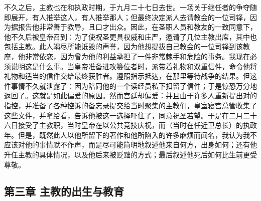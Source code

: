 不久之后，主教也在和执政时期，于九月二十七日去世。一场关于继任者的争夺随即展开，有人推举这人，有人推举那人；但最终决定派人去请教会的一位司铎，因为据报告他非常善于教导，且口才出众。因此，在圣职人员和教友的一致同意下，他不久后被皇帝召到：为了使祝圣更具权威和庄严，邀请了几位主教出席，其中也包括主教。此人竭尽所能诋毁的声誉，因为他想提拔自己教会的一位司铎到该教座，他非常依恋，因为曾为他的利益承担了一件非常棘手和危险的事务。我现在必须说明这是什么事。当皇帝准备进攻篡位者时，派带着礼物和双重信件，命令他将礼物和适当的信件交给最终获胜者。遵照指示抵达，在那里等待战争的结果。但这件事情不久就泄露了：因为陪同他的一个读经员私下扣留了信件；于是惊恐万分地返回了。这就是如此偏爱的原因。然而宫廷却偏爱：并且由于许多人重新提出对的指控，并准备了各种控诉的备忘录提交给当时聚集的主教们，皇室寝宫总管收集了这些文件，并拿给看，告诉他被这一选择吓住了，同意祝圣若望。于是在二月二十六日接受了主教职，当时皇帝在以公共竞技庆祝，而（当时在任近卫总长）的执政年。但是，既然此人以他所留下的著作和他所陷入的许多麻烦而闻名，我认为我不应该对他的事情默不作声，而是尽可能简明地叙述他来自何方，出身如何；还有他升任主教的具体情况，以及他后来被贬黜的方式；最后叙述他死后如何比生前更受尊敬。\par


\subsection{第三章 主教的出生与教育}

